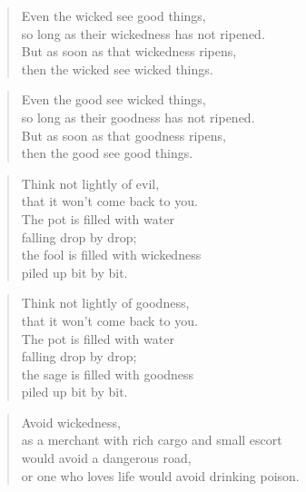 \documentclass[12pt,openany]{book}%
\begin{document}
\begin{verse}%
Even the wicked see good things, \\
so long as their wickedness has not ripened. \\
But as soon as that wickedness ripens, \\
then the wicked see wicked things. 

%
\end{verse}

\begin{verse}%
Even the good see wicked things, \\
so long as their goodness has not ripened. \\
But as soon as that goodness ripens, \\
then the good see good things. 

%
\end{verse}

\begin{verse}%
Think not lightly of evil, \\
that it won’t come back to you. \\
The pot is filled with water \\
falling drop by drop; \\
the fool is filled with wickedness \\
piled up bit by bit. 

%
\end{verse}

\begin{verse}%
Think not lightly of goodness, \\
that it won’t come back to you. \\
The pot is filled with water \\
falling drop by drop; \\
the sage is filled with goodness \\
piled up bit by bit. 

%
\end{verse}

\begin{verse}%
Avoid wickedness, \\
as a merchant with rich cargo and small escort \\
would avoid a dangerous road, \\
or one who loves life would avoid drinking poison. 

%
\end{verse}
\end{document}
